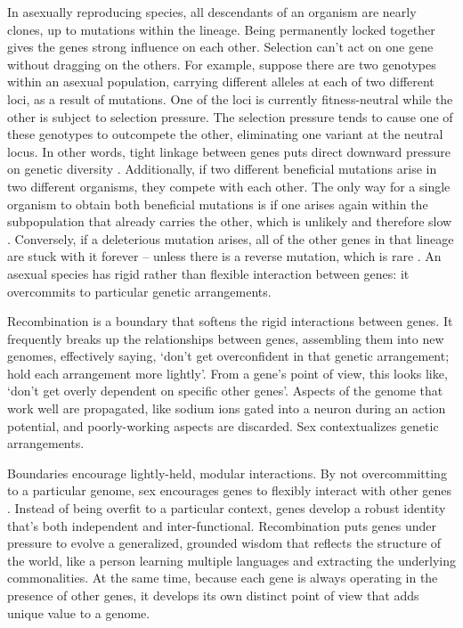 \documentclass[12pt]{article}
\begin{document}
In asexually reproducing species, all descendants of an organism are nearly clones, up to mutations within the lineage. Being permanently locked together gives the genes strong influence on each other. Selection can't act on one gene without dragging on the others. For example, suppose there are two genotypes within an asexual population, carrying different alleles at each of two different loci, as a result of mutations. One of the loci is currently fitness-neutral while the other is subject to selection pressure. The selection pressure tends to cause one of these genotypes to outcompete the other, eliminating one variant at the neutral locus. In other words, tight linkage between genes puts direct downward pressure on genetic diversity \citep{charlesworth1993effect, hudson1995deleterious}. Additionally, if two different beneficial mutations arise in two different organisms, they compete with each other. The only way for a single organism to obtain both beneficial mutations is if one arises again within the subpopulation that already carries the other, which is unlikely and therefore slow \citep{hill1966effect, felsenstein1974evolutionary, weismann1889essays, fisher1930genetial, muller1932some, crow1965evolution}. Conversely, if a deleterious mutation arises, all of the other genes in that lineage are stuck with it forever -- unless there is a reverse mutation, which is rare \citep{keightley2006interference, muller1932some}. An asexual species has rigid rather than flexible interaction between genes: it overcommits to particular genetic arrangements.

Recombination is a boundary that softens the rigid interactions between genes. It frequently breaks up the relationships between genes, assembling them into new genomes, effectively saying, `don't get overconfident in that genetic arrangement; hold each arrangement more lightly'. From a gene's point of view, this looks like, `don't get overly dependent on specific other genes'. Aspects of the genome that work well are propagated, like sodium ions gated into a neuron during an action potential, and poorly-working aspects are discarded. Sex contextualizes genetic arrangements. 

Boundaries encourage lightly-held, modular interactions. By not overcommitting to a particular genome, sex encourages genes to flexibly interact with other genes \citep{livnat2008mixability, livnat2010sex, wagner1996perspective, holland1975adaptation,dawkins1976selfish, clune2013evolutionary}. Instead of being overfit to a particular context, genes develop a robust identity that's both independent and inter-functional. Recombination puts genes under pressure to evolve a generalized, grounded wisdom that reflects the structure of the world, like a person learning multiple languages and extracting the underlying commonalities. At the same time, because each gene is always operating in the presence of other genes, it develops its own distinct point of view that adds unique value to a genome.
\end{document}
